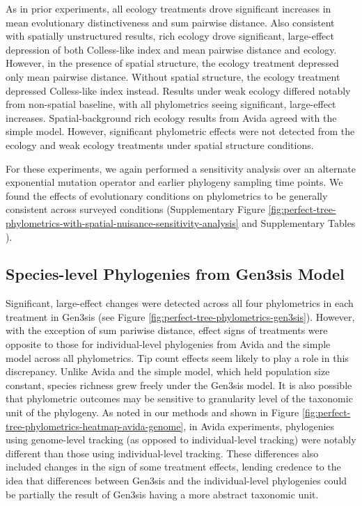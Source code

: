 As in prior experiments, all ecology treatments drove significant increases in mean evolutionary distinctiveness and sum pairwise distance.
Also consistent with spatially unstructured results, rich ecology drove significant, large-effect depression of both Colless-like index and mean pairwise distance and ecology.
However, in the presence of spatial structure, the ecology treatment depressed only mean pairwise distance.
Without spatial structure, the ecology treatment depressed Colless-like index instead.
Results under weak ecology differed notably from non-spatial baseline, with all phylometrics seeing significant, large-effect increases.
Spatial-background rich ecology results from Avida agreed with the simple model.
However, significant phylometric effects were not detected from the ecology and weak ecology treatments under spatial structure conditions.

For these experiments, we again performed a sensitivity analysis over an alternate exponential mutation operator and earlier phylogeny sampling time points.
We found the effects of evolutionary conditions on phylometrics to be generally consistent across surveyed conditions (Supplementary Figure \ref{fig:perfect-tree-phylometrics-with-spatial-nuisance-sensitivity-analysis} and Supplementary Tables ).

\subsection{Species-level Phylogenies from Gen3sis Model}




Significant, large-effect changes were detected across all four phylometrics in each treatment in Gen3sis (see Figure \ref{fig:perfect-tree-phylometrics-gen3sis}).
However, with the exception of sum pariwise distance, effect signs of treatments were opposite to those for individual-level phylogenies from Avida and the simple model across all phylometrics.
Tip count effects seem likely to play a role in this discrepancy.
Unlike Avida and the simple model, which held population size constant, species richness grew freely under the Gen3sis model.
It is also possible that phylometric outcomes may be sensitive to granularity level of the taxonomic unit of the phylogeny.
As noted in our methods and shown in Figure \ref{fig:perfect-tree-phylometrics-heatmap-avida-genome}, in Avida experiments, phylogenies using genome-level tracking (as opposed to individual-level tracking) were notably different than those using individual-level tracking.
These differences also included changes in the sign of some treatment effects, lending credence to the idea that differences between Gen3sis and the individual-level phylogenies could be partially the result of Gen3sis having a more abstract taxonomic unit.

